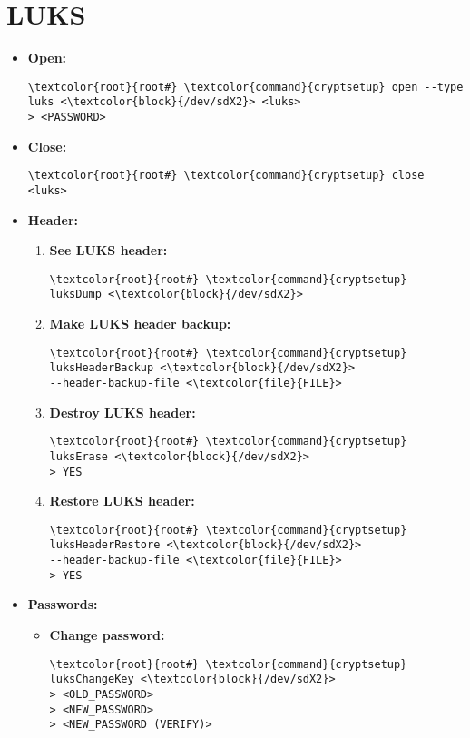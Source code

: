 \documentclass[10pt, a4paper, onecolumn, oneside, titlepage, openany]{book}
\begin{document}
\section{LUKS}
\label{cheatsheet_luks}
\begin{itemize}
    \item \textbf{Open:}
\begin{Verbatim}[commandchars=\\\{\}]
\textcolor{root}{root#} \textcolor{command}{cryptsetup} open --type luks <\textcolor{block}{/dev/sdX2}> <luks>
> <PASSWORD>
\end{Verbatim}
    \item \textbf{Close:}
\begin{Verbatim}[commandchars=\\\{\}]
\textcolor{root}{root#} \textcolor{command}{cryptsetup} close <luks>
\end{Verbatim}
    \item \textbf{Header:}
    \begin{enumerate}
        \item \textbf{See LUKS header:}
\begin{Verbatim}[commandchars=\\\{\}]
\textcolor{root}{root#} \textcolor{command}{cryptsetup} luksDump <\textcolor{block}{/dev/sdX2}>
\end{Verbatim}
        \item \textbf{Make LUKS header backup:}
\begin{Verbatim}[commandchars=\\\{\}]
\textcolor{root}{root#} \textcolor{command}{cryptsetup} luksHeaderBackup <\textcolor{block}{/dev/sdX2}>
--header-backup-file <\textcolor{file}{FILE}>
\end{Verbatim}
        \item \textbf{Destroy LUKS header:}
\begin{Verbatim}[commandchars=\\\{\}]
\textcolor{root}{root#} \textcolor{command}{cryptsetup} luksErase <\textcolor{block}{/dev/sdX2}>
> YES
\end{Verbatim}
        \item \textbf{Restore LUKS header:}
\begin{Verbatim}[commandchars=\\\{\}]
\textcolor{root}{root#} \textcolor{command}{cryptsetup} luksHeaderRestore <\textcolor{block}{/dev/sdX2}>
--header-backup-file <\textcolor{file}{FILE}>
> YES
\end{Verbatim}
    \end{enumerate}
    \item \textbf{Passwords:}
    \begin{itemize}
        \item \textbf{Change password:}
\begin{Verbatim}[commandchars=\\\{\}]
\textcolor{root}{root#} \textcolor{command}{cryptsetup} luksChangeKey <\textcolor{block}{/dev/sdX2}>
> <OLD_PASSWORD>
> <NEW_PASSWORD>
> <NEW_PASSWORD (VERIFY)>
\end{Verbatim}
    \end{itemize}
\end{itemize}
\end{document}
